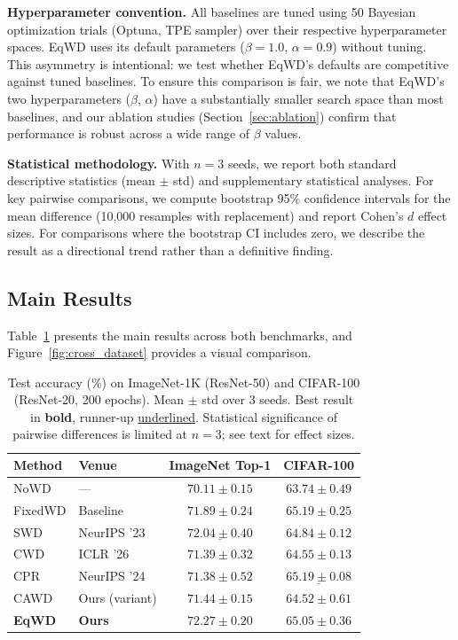 \documentclass{article}
\begin{document}
\textbf{Hyperparameter convention.} All baselines are tuned using 50
Bayesian optimization trials (Optuna, TPE sampler) over their respective
hyperparameter spaces. EqWD uses its default parameters
($\beta = 1.0$, $\alpha = 0.9$) without tuning. This asymmetry is
intentional: we test whether EqWD's defaults are competitive against
tuned baselines. To ensure this comparison is fair, we note that EqWD's
two hyperparameters ($\beta$, $\alpha$) have a substantially smaller
search space than most baselines, and our ablation studies (Section~\ref{sec:ablation})
confirm that performance is robust across a wide range of $\beta$
values.

\textbf{Statistical methodology.} With $n = 3$ seeds, we report both
standard descriptive statistics (mean $\pm$ std) and supplementary
statistical analyses. For key pairwise comparisons, we compute bootstrap
95\% confidence intervals for the mean difference (10,000 resamples with
replacement) and report Cohen's $d$ effect sizes. For comparisons
where the bootstrap CI includes zero, we describe the result as a
directional trend rather than a definitive finding.

\subsection{Main Results}
\label{sec:results}

Table~\ref{tab:main_results} presents the main results
across both benchmarks, and Figure~\ref{fig:cross_dataset} provides a visual comparison.

\begin{table}[t]
\centering
\caption{Test accuracy (\%) on ImageNet-1K (ResNet-50) and CIFAR-100 (ResNet-20, 200 epochs). Mean $\pm$ std over 3 seeds. Best result in \textbf{bold}, runner-up \underline{underlined}. Statistical significance of pairwise differences is limited at $n = 3$; see text for effect sizes.}
\label{tab:main_results}
\small
\begin{tabular}{llcc}
\toprule
Method & Venue & ImageNet Top-1 & CIFAR-100 \\
\midrule
NoWD & --- & $70.11 \pm 0.15$ & $63.74 \pm 0.49$ \\
FixedWD \citep{loshchilov2019adamw} & Baseline & $71.89 \pm 0.24$ & $\mathbf{65.19 \pm 0.25}$ \\
SWD \citep{xie2023swd} & NeurIPS '23 & $\underline{72.04 \pm 0.40}$ & $64.84 \pm 0.12$ \\
CWD \citep{chen2026cwd} & ICLR '26 & $71.39 \pm 0.32$ & $64.55 \pm 0.13$ \\
CPR \citep{franke2024cpr} & NeurIPS '24 & $71.38 \pm 0.52$ & $\underline{65.19 \pm 0.08}$ \\
CAWD & Ours (variant) & $71.44 \pm 0.15$ & $64.52 \pm 0.61$ \\
\textbf{EqWD} & \textbf{Ours} & $\mathbf{72.27 \pm 0.20}$ & $65.05 \pm 0.36$ \\
\bottomrule
\end{tabular}
\end{table}
\end{document}
